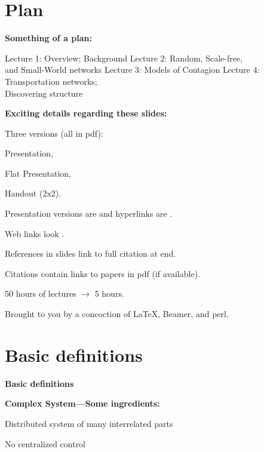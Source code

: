 
\section{Plan}

  \textbf{Something of a plan:}

  
   \alert{Lecture 1:} Overview; Background
   \alert{Lecture 2:} Random, Scale-free, \\
    \qquad \qquad and Small-World networks
   \alert{Lecture 3:} Models of Contagion
   \alert{Lecture 4:} Transportation networks; \\
    \qquad \qquad Discovering structure
  


  \textbf{Exciting details regarding these slides:}

  
  
    Three versions (all in pdf): 
    
     
      Presentation,
    
      Flat Presentation,
    
      Handout (2x2).
    
  
    Presentation versions are  
    and hyperlinks are .
  
    Web links look 
    . 
  
    References in slides link to full citation at end.\cite{anderson1972a}
  
    Citations contain links to papers in pdf (if available).
  
    50 hours of lectures $\rightarrow$ 5 hours.
  
    Brought to you by a concoction of \LaTeX, Beamer, and perl.
  


\section{Basic definitions}

  \textbf{Basic definitions}

  \textbf{Complex System---Some ingredients:}
    
    
      Distributed system of many interrelated parts
    
      No centralized control 
    
